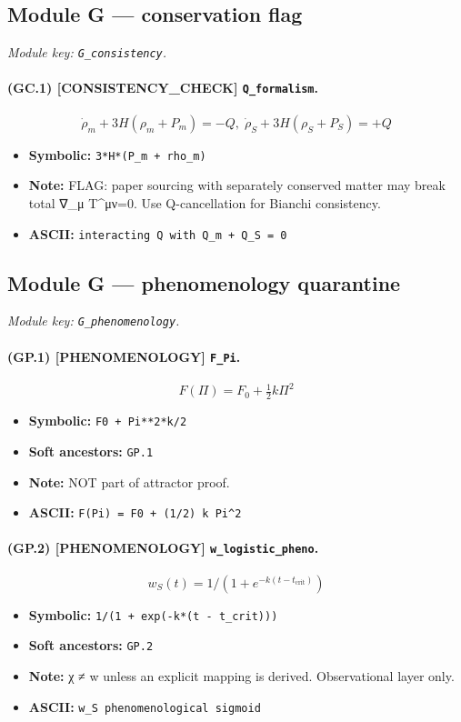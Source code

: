 \documentclass[11pt,a4paper]{article}
\theoremstyle{remark}\newtheorem*{caution}{Caution}
\newcommand{\tagbox}[1]{\textsc{[#1]}}
\begin{document}
\subsection{Module G --- conservation flag}
\textit{Module key: \texttt{G\_consistency}.}
\paragraph{(GC.1) \tagbox{CONSISTENCY\_CHECK} \texttt{Q\_formalism}.}
\begin{equation}
\dot\rho_m+3H(\rho_m+P_m)=-Q,\;\dot\rho_S+3H(\rho_S+P_S)=+Q
\tag{GC.1}
\end{equation}
\begin{itemize}\setlength{\itemsep}{0.12em}
\item \textbf{Symbolic:} \texttt{3*H*(P\_m + rho\_m)}
\item \textbf{Note:} FLAG: paper sourcing with separately conserved matter may break total ∇\_μ T^{μν}=0. Use Q-cancellation for Bianchi consistency.
\item \textbf{ASCII:} \texttt{interacting Q with Q\_m + Q\_S = 0}
\end{itemize}
\subsection{Module G --- phenomenology quarantine}
\textit{Module key: \texttt{G\_phenomenology}.}
\paragraph{(GP.1) \tagbox{PHENOMENOLOGY} \texttt{F\_Pi}.}
\begin{equation}
F(\Pi)=F_0+\tfrac12 k\Pi^2
\tag{GP.1}
\end{equation}
\begin{itemize}\setlength{\itemsep}{0.12em}
\item \textbf{Symbolic:} \texttt{F0 + Pi**2*k/2}
\item \textbf{Soft ancestors:} \texttt{GP.1}
\item \textbf{Note:} NOT part of attractor proof.
\item \textbf{ASCII:} \texttt{F(Pi) = F0 + (1/2) k Pi^2}
\end{itemize}
\paragraph{(GP.2) \tagbox{PHENOMENOLOGY} \texttt{w\_logistic\_pheno}.}
\begin{equation}
w_S(t)=1/(1+e^{-k(t-t_{\mathrm{crit}})})
\tag{GP.2}
\end{equation}
\begin{itemize}\setlength{\itemsep}{0.12em}
\item \textbf{Symbolic:} \texttt{1/(1 + exp(-k*(t - t\_crit)))}
\item \textbf{Soft ancestors:} \texttt{GP.2}
\item \textbf{Note:} χ ≠ w unless an explicit mapping is derived. Observational layer only.
\item \textbf{ASCII:} \texttt{w\_S phenomenological sigmoid}
\end{itemize}
\end{document}
